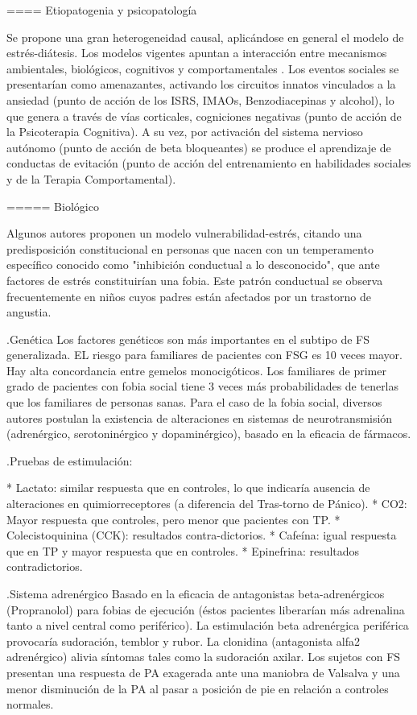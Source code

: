 \documentclass{scrbook}
\begin{document}
==== Etiopatogenia y psicopatología

Se propone una gran heterogeneidad causal, aplicándose en general el modelo de estrés-diátesis. Los modelos vigentes apuntan a interacción entre mecanismos ambientales, biológicos, cognitivos y comportamentales . Los eventos sociales se presentarían como amenazantes, activando los circuitos innatos vinculados a la ansiedad (punto de acción de los ISRS, IMAOs, Benzodiacepinas y alcohol), lo que genera a través de vías corticales, cogniciones negativas (punto de acción de la Psicoterapia Cognitiva). A su vez, por activación del sistema nervioso autónomo (punto de acción de beta bloqueantes) se produce el aprendizaje de conductas de evitación (punto de acción del entrenamiento en habilidades sociales y de la Terapia Comportamental).

===== Biológico

Algunos autores proponen un modelo vulnerabilidad-estrés, citando una predisposición constitucional en personas que nacen con un temperamento específico conocido como "inhibición conductual a lo desconocido", que ante factores de estrés constituirían una fobia. Este patrón conductual se observa frecuentemente en niños cuyos padres están afectados por un trastorno de angustia.

.Genética
Los factores genéticos son más importantes en el subtipo de FS generalizada. EL riesgo para familiares de pacientes con FSG es 10 veces mayor. Hay alta concordancia entre gemelos monocigóticos. Los familiares de primer grado de pacientes con fobia social tiene 3 veces más probabilidades de tenerlas que los familiares de personas sanas. Para el caso de la fobia social, diversos autores postulan la existencia de alteraciones en sistemas de neurotransmisión (adrenérgico, serotoninérgico y dopaminérgico), basado en la eficacia de fármacos.

.Pruebas de estimulación:

* Lactato: similar respuesta que en controles, lo que indicaría ausencia de alteraciones en quimiorreceptores (a diferencia del Tras-torno de Pánico).
* CO2: Mayor respuesta que controles, pero menor que pacientes con TP.
* Colecistoquinina (CCK): resultados contra-dictorios.
* Cafeína: igual respuesta que en TP y mayor respuesta que en controles.
* Epinefrina: resultados contradictorios.

.Sistema adrenérgico
Basado en la eficacia de antagonistas beta-adrenérgicos (Propranolol) para fobias de ejecución (éstos pacientes liberarían más adrenalina tanto a nivel central como periférico). La estimulación beta adrenérgica periférica provocaría sudoración, temblor y rubor. La clonidina (antagonista alfa2 adrenérgico) alivia síntomas tales como la sudoración axilar. Los sujetos con FS presentan una respuesta de PA exagerada ante una maniobra de Valsalva y una menor disminución de la PA al pasar a posición de pie en relación a controles normales.
\end{document}
